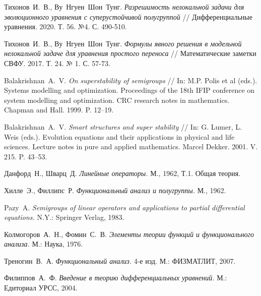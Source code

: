 \documentclass{article}
\theoremstyle{definition}
\begin{document}
\begin{thebibliography}{99}
	

	 Тихонов~И.~В., Ву~Нгуен~Шон~Тунг.
	\emph{Разрешимость нелокальной задачи для эволюционного уравнения с суперустойчивой полугруппой}
	// Дифференциальные уравнения. 2020. Т. 56. №4. С. 490-510.
	
	 Тихонов~И.~В., Ву~Нгуен~Шон~Тунг.
	\emph{Формулы явного решения в модельной нелокальной задаче для уравнения простого переноса}
	// Математические заметки СВФУ. 2017. Т. 24. № 1. С. 57-73.
	
	 Balakrishnan~A.~V.
	\emph{On superstability of semigroups}
	// In: M.P. Polis et al (eds.). Systems modelling and optimization. 
	Proceedings of the 18th IFIP conference on system modelling and optimization. 
	CRC research notes in mathematics. Chapman and Hall. 1999. P. 12–19.
	
	 Balakrishnan~A.~V.
	\emph{Smart structures and super stability} 
	// In: G. Lumer, L. Weis (eds.). Evolution
	equations and their applications in physical and life sciences. Lecture notes in pure and applied
	mathematics. Marcel Dekker. 2001. V. 215. P. 43–53.
	
	 Данфорд~Н., Шварц~Д.
	\emph{Линейные операторы.} М., 1962, Т.1. Общая теория.
	
	 Хилле~Э., Филлипс~Р.
	\emph{Функциональный анализ и полугруппы.} М., 1962.

	 Pazy~A.
	\emph{Semigroups of linear operators and applications to partial differential equations.} N.Y.: Springer Verlag, 1983.
	
	 Колмогоров~А.~Н., Фомин~С.~В.
	\emph{Элементы теории функций и функционального анализа.} М.: Наука, 1976.
	
	 Треногин~В.~А.
	\emph{Функциональный анализ.} 4-е изд. М.: ФИЗМАТЛИТ, 2007.
	
	 Филиппов~А.~Ф.
	\emph{Введение в теорию дифференциальных уравнений.} М.: Едиториал УРСС, 2004.
\end{thebibliography}
\end{document}
